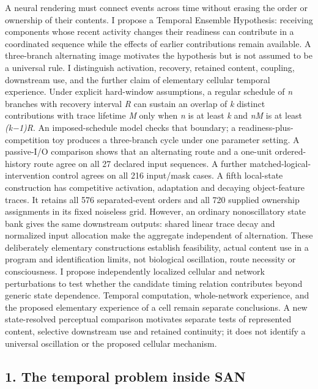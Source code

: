 \documentclass[
  american,
  11pt,
  letterpaper,
]{article}
\begin{document}
A neural rendering must connect events across time without erasing the order or ownership of their contents. I propose a Temporal Ensemble Hypothesis: receiving components whose recent activity changes their readiness can contribute in a coordinated sequence while the effects of earlier contributions remain available. A three-branch alternating image motivates the hypothesis but is not assumed to be a universal rule. I distinguish activation, recovery, retained content, coupling, downstream use, and the further claim of elementary cellular temporal experience. Under explicit hard-window assumptions, a regular schedule of \emph{n} branches with recovery interval \emph{R} can sustain an overlap of \emph{k} distinct contributions with trace lifetime \emph{M} only when \emph{n} is at least \emph{k} and \emph{nM} is at least \emph{(k−1)R}. An imposed-schedule model checks that boundary; a readiness-plus-competition toy produces a three-branch cycle under one parameter setting. A passive-I/O comparison shows that an alternating route and a one-unit ordered-history route agree on all 27 declared input sequences. A further matched-logical-intervention control agrees on all 216 input/mask cases. A fifth local-state construction has competitive activation, adaptation and decaying object-feature traces. It retains all 576 separated-event orders and all 720 supplied ownership assignments in its fixed noiseless grid. However, an ordinary nonoscillatory state bank gives the same downstream outputs: shared linear trace decay and normalized input allocation make the aggregate independent of alternation. These deliberately elementary constructions establish feasibility, actual content use in a program and identification limits, not biological oscillation, route necessity or consciousness. I propose independently localized cellular and network perturbations to test whether the candidate timing relation contributes beyond generic state dependence. Temporal computation, whole-network experience, and the proposed elementary experience of a cell remain separate conclusions. A new state-resolved perceptual comparison motivates separate tests of represented content, selective downstream use and retained continuity; it does not identify a universal oscillation or the proposed cellular mechanism.

\subsection{1. The temporal problem inside SAN}\label{the-temporal-problem-inside-san}
\end{document}
